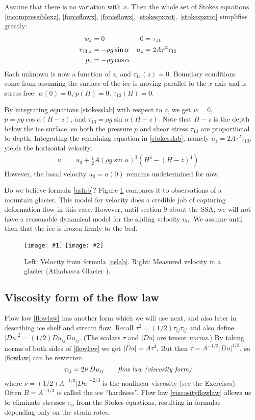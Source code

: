 \documentclass[letterpaper,final,12pt,reqno]{amsart}
\newcommand{\twofigsizes}[5]{
\begin{figure}[ht]
\centering
\texttt{[image: \#1]} \quad
\texttt{[image: \#2]}
\caption{#3}
\label{fig:#1}
\end{figure}}
\begin{document}
Assume that there is no variation with $x$. Then the whole set of Stokes equations \eqref{incompressiblexz}, \eqref{forceflowx}, \eqref{forceflowz}, \eqref{stokespxrot}, \eqref{stokespzrot} simplifies greatly:
\begin{align}
w_z &= 0 &   0 &= \tau_{11} \label{stokesslab} \\
\tau_{13,z} &= - \rho g \sin\alpha &   u_z &= 2 A \tau^2 \tau_{13} \notag \\
p_z &= - \rho g \cos\alpha \notag
\end{align}
Each unknown is now a function of $z$, and $\tau_{11}(z)=0$.  Boundary conditions come from assuming the surface of the ice is moving parallel to the $x$-axis and is stress free: $w(0)=0$, $p(H)=0$, $\tau_{13}(H)=0$.

By integrating equations \eqref{stokesslab} with respect to $z$, we get $w=0$, $p = \rho g \cos\alpha (H-z)$, and $\tau_{13} = \rho g \sin\alpha (H-z)$.  Note that $H-z$ is the depth below the ice surface, so both the pressure $p$ and shear stress $\tau_{13}$ are proportional to depth.  Integrating the remaining equation in \eqref{stokesslab}, namely $u_z = 2 A \tau^2 \tau_{13}$, yields the horizontal velocity:
\begin{align}
u &= u_0 + \frac{1}{2} A (\rho g \sin\alpha)^3  \left(H^4 - (H-z)^4\right)  \label{uslab}
\end{align}
However, the basal velocity $u_0=u(0)$ remains undetermined for now.

Do we believe formula \eqref{uslab}?  Figure \ref{fig:slabvel} compares it to observations of a mountain glacier.  This model for velocity does a credible job of capturing deformation flow in this case.  However, until section 9 about the SSA, we will not have a reasonable dynamical model for the sliding velocity $u_0$.  We assume until then that the ice is frozen firmly to the bed.

\twofigsizes{slabvel}{athabasca-deform}{Left:  Velocity from formula \eqref{uslab}.  Right:  Measured velocity in a glacier (Athabasca Glacier \cite{SavagePaterson}).}{2.0in}{1.8in}

\subsection*{Viscosity form of the flow law}  Flow law \eqref{flowlaw} has another form which we will use next, and also later in describing ice shelf and stream flow.  Recall $\tau^2 = (1/2) \tau_{ij} \tau_{ij}$ and also define $|Du|^2 = (1/2) Du_{ij} Du_{ij}$.  (The scalars $\tau$ and $|Du|$ are tensor \emph{norms}.)  By taking norms of both sides of \eqref{flowlaw} we get $|Du| = A \tau^3$.  But then $\tau = A^{-1/3} |Du|^{1/3}$, so \eqref{flowlaw} can be rewritten
\begin{equation}
\tau_{ij} = 2 \nu\, Du_{ij}  \qquad \text{\emph{flow law (viscosity form)}} \label{viscosityflowlaw}
\end{equation}
where $\nu = (1/2) A^{-1/3} |Du|^{-2/3}$ is the nonlinear viscosity (see the Exercises).  Often $B = A^{-1/3}$ is called the ice ``hardness''.  Flow law \eqref{viscosityflowlaw} allows us to eliminate stresses $\tau_{ij}$ from the Stokes equations, resulting in formulas depending only on the strain rates.
\end{document}

